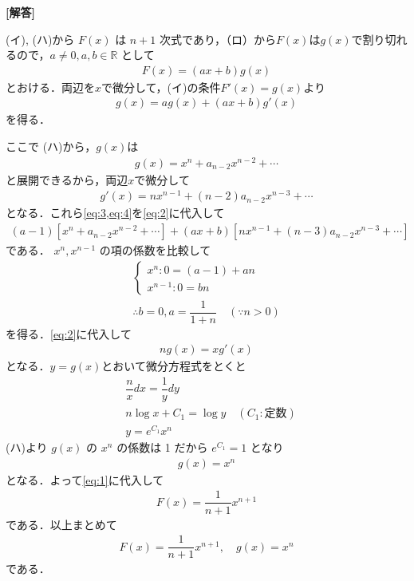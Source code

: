 \documentclass[../../main.tex]{subfiles}
\begin{document}
\begin{oframed}
  
\end{oframed}

{\bf [解答]}

(イ), (ハ)から $F(x)$ は $n+1$ 次式であり，（ロ）から$F(x)$は$g(x)$で割り切れるので，$a \neq 0, a, b \in \mathbb{R}$ として
\begin{align}
  F(x) = (ax+b) g(x) \label{eq:1}
\end{align}
とおける．両辺を$x$で微分して，(イ)の条件$F'(x)=g(x)$より
\begin{align}
  g(x) = a g(x) + (ax+b) g'(x) \label{eq:2}
\end{align}
を得る．

ここで (ハ)から，$g(x)$は
\begin{align}
  g(x) = x^n + a_{n-2} x^{n-2} + \cdots \label{eq:3}
\end{align}
と展開できるから，両辺$x$で微分して
\begin{align}
  g'(x) = n x^{n-1} + (n-2) a_{n-2} x^{n-3} + \cdots \label{eq:4}
\end{align}
となる．これら\cref{eq:3,eq:4}を\cref{eq:2}に代入して
\begin{align}
  (a-1)\left[x^n + a_{n-2} x^{n-2} + \cdots\right] + (ax+b)\left[n x^{n-1} + (n-3) a_{n-2} x^{n-3} + \cdots\right] \label{eq:5}
\end{align}
である． $x^n, x^{n-1}$ の項の係数を比較して
\begin{align}
  \begin{cases}
    x^n:  0 = (a-1)  + a n  \\
    x^{n-1}:  0 =  b n
  \end{cases} \\
  \therefore
  b = 0, a = \dfrac{1}{1+n} \quad (\because n > 0) \label{eq:6}
\end{align}
を得る．\cref{eq:2}に代入して
\begin{align}
  ng(x) = x g'(x) \label{eq:7}
\end{align}
となる．$y=g(x)$とおいて微分方程式をとくと
\begin{align}
  & \dfrac{n}{x} dx = \dfrac{1}{y} dy \\
  & n \log x + C_1 = \log y \quad (C_1: \text{定数}) \\
  & y = e^{C_1} x^n
\end{align}
(ハ)より $g(x)$ の $x^n$ の係数は 1 だから $e^{C_1} = 1$ となり
\begin{align}
  g(x) = x^n
\end{align}
となる．よって\cref{eq:1}に代入して
\begin{align}
  F(x) = \dfrac{1}{n+1} x^{n+1}
\end{align}
である．以上まとめて
\begin{align}
  F(x) = \dfrac{1}{n+1} x^{n+1},
  \quad
  g(x) = x^n
\end{align}
である．

\newpage
\end{document}
